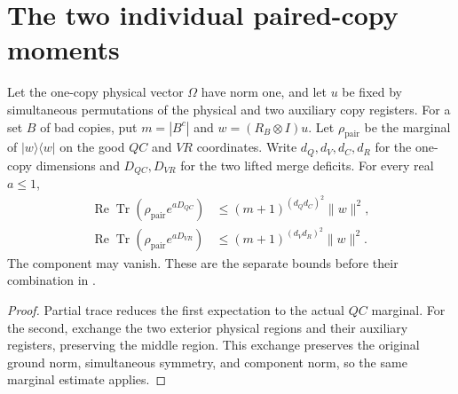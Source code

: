 \section{The two individual paired-copy moments}
\label{sec:replica_individual_pair_merge_moments}

\begin{theorem}
\label{thm:replica_individual_pair_merge_moments}
\leanok
Let the one-copy physical vector $\Omega$ have norm one, and let $u$
be fixed by simultaneous permutations of the physical and two auxiliary
copy registers. For a set $B$ of bad copies, put $m=|B^c|$ and
$w=(R_B\otimes I)u$. Let $\rho_{\mathrm{pair}}$ be the marginal of
$|w\rangle\langle w|$ on the good $QC$ and $VR$ coordinates.
Write $d_Q,d_V,d_C,d_R$ for the one-copy dimensions and $D_{QC},D_{VR}$
for the two lifted merge deficits. For every real $a\leq1$,
\begin{align}
 \operatorname{Re}\operatorname{Tr}(\rho_{\mathrm{pair}}e^{aD_{QC}})
 &\leq (m+1)^{(d_Qd_C)^2}\|w\|^2,\\
 \operatorname{Re}\operatorname{Tr}(\rho_{\mathrm{pair}}e^{aD_{VR}})
 &\leq (m+1)^{(d_Vd_R)^2}\|w\|^2.
\end{align}
The component may vanish. These are the separate bounds before their
combination in \cite[Section~8]{OpenAI2026AreaLaw}.
\end{theorem}
\begin{proof}\leanok
{}
Partial trace reduces the first expectation to the actual $QC$
marginal. For the second, exchange the two exterior physical regions
and their auxiliary registers, preserving the middle region. This
exchange preserves the original ground norm, simultaneous symmetry,
and component norm, so the same marginal estimate applies.
\end{proof}
